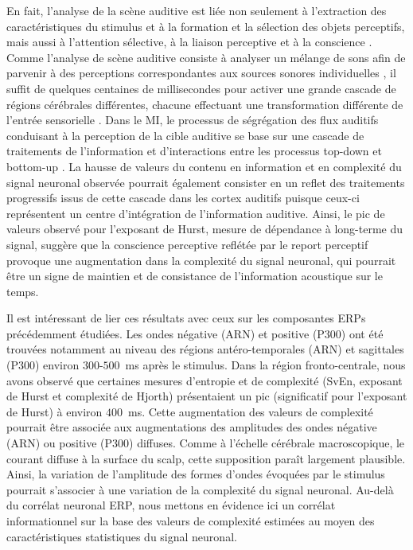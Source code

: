 En fait, l'analyse de la scène auditive est liée non seulement à l'extraction des caractéristiques du stimulus et à la formation et la sélection des objets perceptifs, mais aussi à l'attention sélective, à la liaison perceptive et à la conscience \citep{elhilali2009interaction, kaya2017modelling, kondo2017auditory, moore2012properties, pressnitzer2006temporal, snyder2012attention}. 
Comme l'analyse de scène auditive consiste à analyser un mélange de sons afin de parvenir à des perceptions correspondantes aux sources sonores individuelles \citep{bregman1994auditory}, il suffit de quelques centaines de millisecondes pour activer une grande cascade de régions cérébrales différentes, chacune effectuant une transformation différente de l'entrée sensorielle \citep{groen2017contributions}. 
Dans le MI, le processus de ségrégation des flux auditifs conduisant à la perception de la cible auditive se base sur une cascade de traitements de l'information et d'interactions entre les processus top-down et bottom-up \citep{elhilali2009interaction}. 
La hausse de valeurs du contenu en information et en complexité du signal neuronal observée pourrait également consister en un reflet des traitements progressifs issus de cette cascade dans les cortex auditifs puisque ceux-ci représentent un centre d'intégration de l'information auditive. 
Ainsi, le pic de valeurs observé pour l'exposant de Hurst, mesure de dépendance à long-terme du signal, suggère que la conscience perceptive reflétée par le report perceptif provoque une augmentation dans la complexité du signal neuronal, qui pourrait être un signe de maintien et de consistance de l’information acoustique sur le temps. 

Il est intéressant de lier ces résultats avec ceux sur les composantes ERPs précédemment étudiées. 
Les ondes négative (ARN) et positive (P300) ont été trouvées notamment au niveau des régions antéro-temporales (ARN) et sagittales (P300) environ $300$-$500$~ms après le stimulus. 
Dans la région fronto-centrale, nous avons observé que certaines mesures d'entropie et de complexité (SvEn, exposant de Hurst et complexité de Hjorth) présentaient un pic (significatif pour l'exposant de Hurst) à environ $400$~ms. 
Cette augmentation des valeurs de complexité pourrait être associée aux augmentations des amplitudes des ondes négative (ARN) ou positive (P300) diffuses. 
Comme à l'échelle cérébrale macroscopique, le courant diffuse à la surface du scalp, cette supposition paraît largement plausible. 
Ainsi, la variation de l'amplitude des formes d'ondes évoquées par le stimulus pourrait s'associer à une variation de la complexité du signal neuronal. 
Au-delà du corrélat neuronal ERP, nous mettons en évidence ici un corrélat informationnel sur la base des valeurs de complexité estimées au moyen des caractéristiques statistiques du signal neuronal. 

